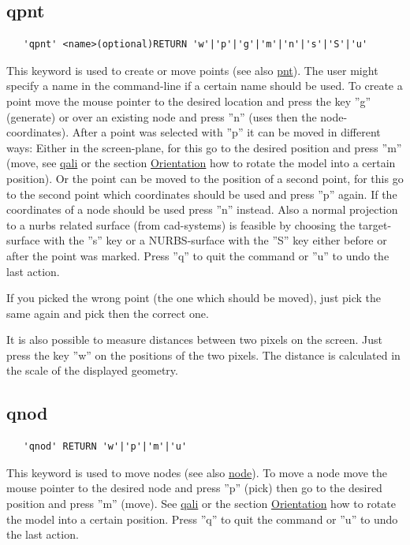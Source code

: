 \documentclass{article}
\providecommand{\htmlref}[2]{\hyperref[#2]{#1}}
\begin{document}
\subsection{\label{qpnt}qpnt}
\begin{verbatim}
   'qpnt' <name>(optional)RETURN 'w'|'p'|'g'|'m'|'n'|'s'|'S'|'u'
\end{verbatim}
This keyword is used to create or move points (see also \htmlref{pnt}{pnt}). The user might specify a name in the command-line if a certain name should be used. To create a point move the mouse pointer to the desired location and press the key ''g'' (generate) or over an existing node and press ''n'' (uses then the node-coordinates). After a point was selected with ''p'' it can be moved in different ways: Either in the screen-plane, for this go to the desired position and press ''m'' (move, see \htmlref{qali}{qali} or the section \htmlref{Orientation}{Orientation} how to rotate the model into a certain position). Or the point can be moved to the position of a second point, for this go to the second point which coordinates should be used and press ''p'' again. If the coordinates of a node should be used press ''n'' instead. Also a normal projection to a nurbs related surface (from cad-systems) is feasible by choosing the target-surface with the ''s'' key or a NURBS-surface with the ''S'' key either before or after the point was marked. Press ''q'' to quit the command or ''u'' to undo the last action.

If you picked the wrong point (the one which should be moved), just pick the same again and pick then the correct one.

It is also possible to measure distances between two pixels on the screen. Just press the key ''w'' on the positions of the two pixels. The distance is calculated in the scale of the displayed geometry.  

\subsection{\label{qnod}qnod}
\begin{verbatim}
   'qnod' RETURN 'w'|'p'|'m'|'u'
\end{verbatim}
This keyword is used to move nodes (see also \htmlref{node}{node}). To move a node move the mouse pointer to the desired node and press ''p'' (pick) then go to the desired position and press ''m'' (move). See \htmlref{qali}{qali} or the section \htmlref{Orientation}{Orientation} how to rotate the model into a certain position. Press ''q'' to quit the command or ''u'' to undo the last action. 
\end{document}
